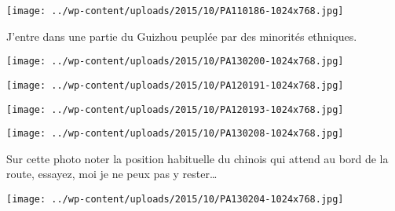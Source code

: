  

\begin{center} \texttt{[image: ../wp-content/uploads/2015/10/PA110186-1024x768.jpg]} \end{center}

 

 J'entre dans une partie du Guizhou peuplée par des minorités ethniques. 

 

\begin{center} \texttt{[image: ../wp-content/uploads/2015/10/PA130200-1024x768.jpg]} \end{center}

 

 

\begin{center} \texttt{[image: ../wp-content/uploads/2015/10/PA120191-1024x768.jpg]} \end{center}

 

 

\begin{center} \texttt{[image: ../wp-content/uploads/2015/10/PA120193-1024x768.jpg]} \end{center}

 

 

\begin{center} \texttt{[image: ../wp-content/uploads/2015/10/PA130208-1024x768.jpg]} \end{center}

 

 Sur cette photo noter la position habituelle du chinois qui attend au bord de la route, essayez, moi je ne peux pas y rester… 

 

\begin{center} \texttt{[image: ../wp-content/uploads/2015/10/PA130204-1024x768.jpg]} \end{center}




 
 
